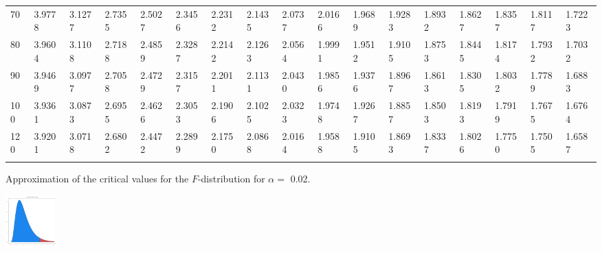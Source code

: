 {\begin{tabular}{|m{8pt}|m{18pt}*{15}{m{18pt}}}
 70 & 3.9778 & 3.1277 & 2.7355 & 2.5027 & 2.3456 & 2.2312 & 2.1435 & 2.0737 & 2.0166 & 1.9689 & 1.9283 & 1.8932 & 1.8627 & 1.8357 & 1.8117 & 1.7223 \\[2pt] \arrayrulecolor{light-gray}\hline\arrayrulecolor{black}  
 80 & 3.9604 & 3.1108 & 2.7188 & 2.4859 & 2.3287 & 2.2142 & 2.1263 & 2.0564 & 1.9991 & 1.9512 & 1.9105 & 1.8753 & 1.8445 & 1.8174 & 1.7932 & 1.7032 \\[2pt] \arrayrulecolor{light-gray}\hline\arrayrulecolor{black}  
 90 & 3.9469 & 3.0977 & 2.7058 & 2.4729 & 2.3157 & 2.2011 & 2.1131 & 2.0430 & 1.9856 & 1.9376 & 1.8967 & 1.8613 & 1.8305 & 1.8032 & 1.7789 & 1.6883 \\[2pt] \arrayrulecolor{light-gray}\hline\arrayrulecolor{black}  
100 & 3.9361 & 3.0873 & 2.6955 & 2.4626 & 2.3053 & 2.1906 & 2.1025 & 2.0323 & 1.9748 & 1.9267 & 1.8857 & 1.8503 & 1.8193 & 1.7919 & 1.7675 & 1.6764 \\[2pt] \arrayrulecolor{light-gray}\hline\arrayrulecolor{black}  
120 & 3.9201 & 3.0718 & 2.6802 & 2.4472 & 2.2899 & 2.1750 & 2.0868 & 2.0164 & 1.9588 & 1.9105 & 1.8693 & 1.8337 & 1.8026 & 1.7750 & 1.7505 & 1.6587 \\[2pt] \arrayrulecolor{light-gray}\hline\arrayrulecolor{black}  
\end{tabular}}
\clearpage

Approximation of the critical values for the $F$-distribution for
$\alpha=$ 0.02. 

 \includegraphics[height=2.0cm]{img/FDistribution}

